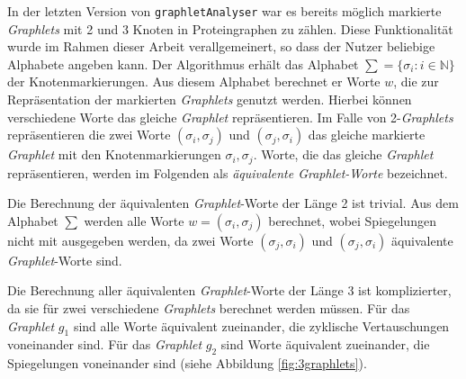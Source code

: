 \documentclass{report}
\begin{document}
In der letzten Version von \texttt{graphletAnalyser} war es bereits m\"oglich markierte \textit{Graphlets} mit 2 und 3 Knoten in Proteingraphen zu z\"ahlen. Diese Funktionalit\"at wurde im Rahmen dieser Arbeit verallgemeinert, so dass der Nutzer beliebige Alphabete angeben kann.
Der Algorithmus erh\"alt das Alphabet $\sum = \{ \sigma_i : i \in \mathbb{N} \}$ der Knotenmarkierungen. Aus diesem Alphabet berechnet er Worte $w$, die zur Repr\"asentation der markierten \textit{Graphlets} genutzt werden.
Hierbei k\"onnen verschiedene Worte das gleiche \textit{Graphlet} repr\"asentieren. Im Falle von 2-\textit{Graphlets} repr\"asentieren die zwei Worte $(\sigma_i,\sigma_j)$ und $(\sigma_j, \sigma_i)$ das gleiche markierte \textit{Graphlet} mit den Knotenmarkierungen $\sigma_i,\sigma_j$. Worte, die das gleiche \textit{Graphlet} repr\"asentieren, werden im Folgenden als \emph{\"aquivalente Graphlet-Worte}  bezeichnet.


Die Berechnung der \"aquivalenten \textit{Graphlet}-Worte der L\"ange 2 ist trivial. Aus dem Alphabet $\sum$ werden alle Worte $w = (\sigma_i, \sigma_j)$ berechnet, wobei Spiegelungen nicht mit ausgegeben werden, da zwei Worte $ (\sigma_j, \sigma_i) $ und $ (\sigma_j, \sigma_i) $ \"aquivalente \textit{Graphlet}-Worte sind.

Die Berechnung aller \"aquivalenten \textit{Graphlet}-Worte der L\"ange 3 ist komplizierter, da sie f\"ur zwei verschiedene \textit{Graphlets} berechnet werden m\"ussen. F\"ur das \textit{Graphlet} $g_1$ sind alle Worte \"aquivalent zueinander, die zyklische Vertauschungen voneinander sind. F\"ur das \textit{Graphlet} $g_2$ sind Worte \"aquivalent zueinander, die Spiegelungen voneinander sind (siehe Abbildung \ref{fig:3graphlets}). \\



%
%
\end{document}

